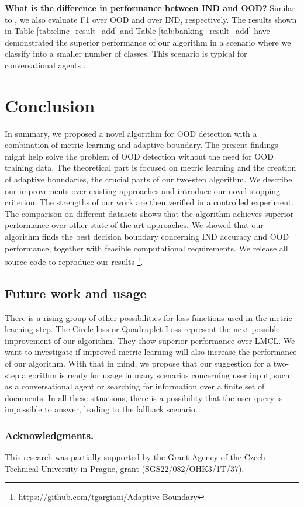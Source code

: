 \documentclass[runningheads]{llncs}
\begin{document}
\textbf{What is the difference in performance between IND and OOD?} Similar to \cite{zhang2021adaptive_decision_boundary}, we also evaluate F1 over OOD and over IND, respectively. The results shown in Table \ref{tab:clinc_result_add} and Table \ref{tab:banking_result_add} have demonstrated the superior performance of our algorithm in a scenario where we classify into a smaller number of classes. This scenario is typical for conversational agents \cite{konrad2021alquist4}.









\section{Conclusion}
In summary, we proposed a novel algorithm for OOD detection with a combination of metric learning and adaptive boundary. The present findings might help solve the problem of OOD detection without the need for OOD training data. The theoretical part is focused on metric learning and the creation of adaptive boundaries, the crucial parts of our two-step algorithm. We describe our improvements over existing approaches and introduce our novel stopping criterion. The strengths of our work are then verified in a controlled experiment. The comparison on different datasets shows that the algorithm achieves superior performance over other state-of-the-art approaches. We showed that our algorithm finds the best decision boundary concerning IND accuracy and OOD performance, together with feasible computational requirements. We release all source code to reproduce our results \footnote{https://github.com/tgargiani/Adaptive-Boundary}.

\subsection{Future work and usage}

There is a rising group of other possibilities for loss functions used in the metric learning step. The Circle loss \cite{sun2020circleloss} or Quadruplet Loss \cite{chen2017quadruplettriplet} represent the next possible improvement of our algorithm. They show superior performance over LMCL. We want to investigate if improved metric learning will also increase the performance of our algorithm.  
With that in mind, we propose that our suggestion for a two-step algorithm is ready for usage in many scenarios concerning user input, such as a conversational agent or searching for information over a finite set of documents. In all these situations, there is a possibility that the user query is impossible to answer, leading to the fallback scenario.

\subsubsection{Acknowledgments.}

This research was partially supported by the Grant Agency of the Czech Technical University in Prague, grant (SGS22/082/OHK3/1T/37).



\end{document}
